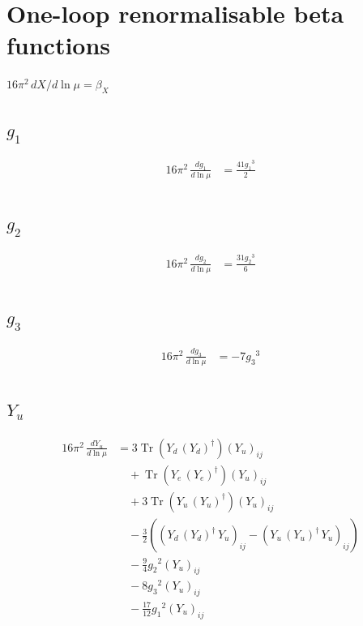 \documentclass[10pt,a4paper]{article}
\begin{document}
\section*{One-loop renormalisable beta functions}
$16\pi^2\,dX/d\ln\mu=\beta_X$
\subsection*{$g_1$}
\begin{align*}
16\pi^2\,\frac{d g_1}{d\ln\mu} &=\frac{41 {g_1}^3}{2} \\
\end{align*}
\subsection*{$g_2$}
\begin{align*}
16\pi^2\,\frac{d g_2}{d\ln\mu} &=\frac{31 {g_2}^3}{6} \\
\end{align*}
\subsection*{$g_3$}
\begin{align*}
16\pi^2\,\frac{d g_3}{d\ln\mu} &=-7 {g_3}^3 \\
\end{align*}
\subsection*{$Y_u$}
\begin{align*}
16\pi^2\,\frac{d Y_u}{d\ln\mu} &=3 \operatorname{Tr}\!\left({Y_d}\,\left({Y_d}\right)^{\dagger}\right) \left({Y_u}\right)_{ij} \\
&\quad +\operatorname{Tr}\!\left({Y_e}\,\left({Y_e}\right)^{\dagger}\right) \left({Y_u}\right)_{ij} \\
&\quad +3 \operatorname{Tr}\!\left({Y_u}\,\left({Y_u}\right)^{\dagger}\right) \left({Y_u}\right)_{ij} \\
&\quad -\frac{3}{2} (\left({Y_d}\,\left({Y_d}\right)^{\dagger}\,{Y_u}\right)_{ij}-\left({Y_u}\,\left({Y_u}\right)^{\dagger}\,{Y_u}\right)_{ij}) \\
&\quad -\frac{9}{4} {g_2}^2 \left({Y_u}\right)_{ij} \\
&\quad -8 {g_3}^2 \left({Y_u}\right)_{ij} \\
&\quad -\frac{17}{12} {g_1}^2 \left({Y_u}\right)_{ij} \\
\end{align*}
\end{document}
